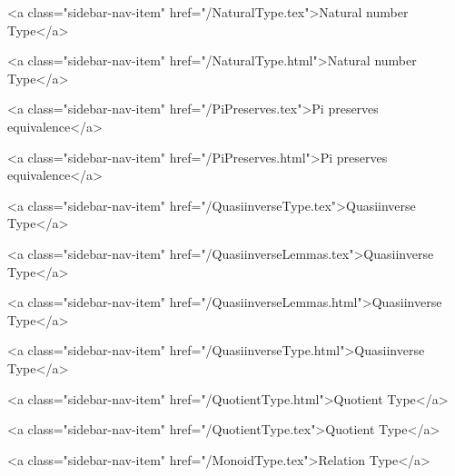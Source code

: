       
        
          <a class="sidebar-nav-item" href="/NaturalType.tex">Natural number Type</a>
        
      
    
      
        
          <a class="sidebar-nav-item" href="/NaturalType.html">Natural number Type</a>
        
      
    
      
        
          <a class="sidebar-nav-item" href="/PiPreserves.tex">Pi preserves equivalence</a>
        
      
    
      
        
          <a class="sidebar-nav-item" href="/PiPreserves.html">Pi preserves equivalence</a>
        
      
    
      
        
          <a class="sidebar-nav-item" href="/QuasiinverseType.tex">Quasiinverse Type</a>
        
      
    
      
        
          <a class="sidebar-nav-item" href="/QuasiinverseLemmas.tex">Quasiinverse Type</a>
        
      
    
      
        
          <a class="sidebar-nav-item" href="/QuasiinverseLemmas.html">Quasiinverse Type</a>
        
      
    
      
        
          <a class="sidebar-nav-item" href="/QuasiinverseType.html">Quasiinverse Type</a>
        
      
    
      
        
          <a class="sidebar-nav-item" href="/QuotientType.html">Quotient Type</a>
        
      
    
      
        
          <a class="sidebar-nav-item" href="/QuotientType.tex">Quotient Type</a>
        
      
    
      
        
          <a class="sidebar-nav-item" href="/MonoidType.tex">Relation Type</a>
        
